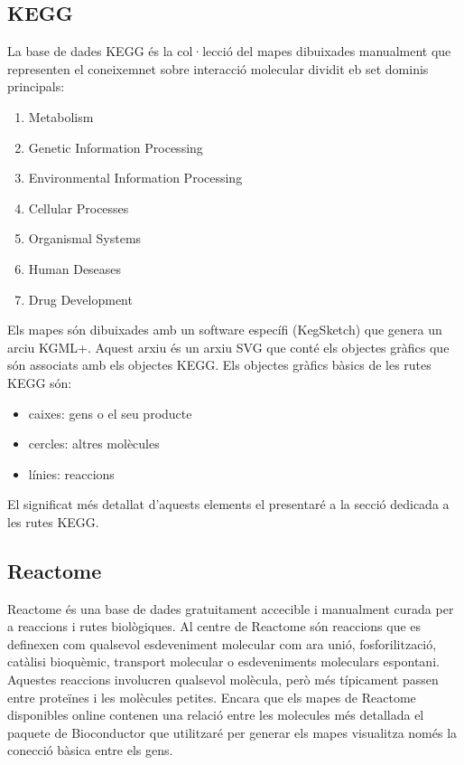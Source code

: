 \subsection{KEGG}
La base de dades KEGG és la col·lecció del mapes dibuixades manualment que representen el coneixemnet sobre interacció molecular dividit eb set dominis principals:
\begin{enumerate}
\item Metabolism
\item Genetic Information Processing
\item Environmental Information Processing
\item Cellular Processes
\item Organismal Systems
\item Human Deseases
\item Drug Development
\end{enumerate}

Els mapes són dibuixades amb un software específi (KegSketch) que genera un arciu KGML+. Aquest arxiu és un arxiu SVG que conté els objectes gràfics que són associats amb els objectes KEGG. Els objectes gràfics bàsics de les rutes KEGG són:
\begin{itemize}
\item caixes: gens o el seu producte
\item cercles: altres molècules
\item línies: reaccions
\end{itemize}
 
El significat més detallat d'aquests elements el presentaré a la secció dedicada a les rutes KEGG.

\subsection{Reactome}

Reactome és una base de dades gratuitament accecible i manualment curada per a reaccions i rutes biològiques. Al centre de Reactome són reaccions que es definexen com qualsevol esdeveniment molecular com ara unió, fosforilització, catàlisi bioquèmic, transport molecular o esdeveniments moleculars espontani. Aquestes reaccions involucren qualsevol molècula, però més típicament passen entre proteïnes i les molècules petites. Encara que els mapes de Reactome disponibles online contenen una relació entre les molecules més detallada el paquete de Bioconductor que utilitzaré per generar els mapes visualitza només la conecció bàsica entre els gens. 

